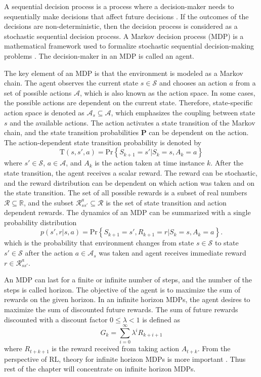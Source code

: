 \documentclass[english, 12pt, a4paper, elec, utf8, a-1b, online]{aaltothesis}
\renewcommand{\vec}[1]{\mathbf{#1}}
\newcommand{\Ss}{\mathcal{S}}
\newcommand{\As}{\mathcal{A}}
\newcommand{\Rs}{\mathcal{R}}
\renewcommand{\Pr}[1]{\text{Pr}\left\{ #1 \right\}}
\newcommand{\stprobs}{\vec{P}}
\newcommand{\real}{\mathbb{R}}
\begin{document}
A sequential decision process is a process where a decision-maker needs to sequentially make decisions that affect future decisions \cite{LaValle2006}.
If the outcomes of the decisions are non-deterministic, then the decision process is considered as a stochastic sequential decision process.
A Markov decision process (MDP) is a mathematical framework used to formalize stochastic sequential decision-making problems \cite{Sutton2018}.
The decision-maker in an MDP is called an agent.

The key element of an MDP is that the environment is modeled as a Markov chain.
The agent observes the current state $s \in \Ss$ and chooses an action $a$ from a set of possible actions $\As$, which is also known as the action space.
In some cases, the possible actions are dependent on the current state.
Therefore, state-specific action space is denoted as $\As_s \subseteq \As$, which emphasizes the coupling between state $s$ and the available actions. 
The action activates a state transition of the Markov chain, and the state transition probabilities $\stprobs$ can be dependent on the action.
The action-dependent state transition probability is denoted by 
\begin{equation}\label{eq:mdp_st_prob}
    \mathrm{T}(s, s', a) = \Pr{S_{k+1}=s' | S_{k}=s , A_k=a}
\end{equation}
where $s' \in \Ss$, $a \in \As$, and $A_k$ is the action taken at time instance $k$.  
After the state transition, the agent receives a scalar reward.
The reward can be stochastic, and the reward distribution can be dependent on which action was taken and on the state transition.
The set of all possible rewards is a subset of real numbers $\Rs \subseteq \real$, and the subset $\Rs_{ss'}^a \subseteq \Rs$ is the set of state transition and action dependent rewards.
The dynamics of an MDP can be summarized with a single probability distribution
\begin{equation}\label{eq:MDP_probs}
    p(s', r | s, a) = \Pr{ S_{k+1}=s', R_{k+1}=r | S_k=s, A_k=a }.
\end{equation}
which is the probability that environment changes from state $s \in \Ss$ to state $s' \in \Ss$ after the action $a \in \As_s$ was taken and agent receives immediate reward $r \in \Rs_{ss'}^a$.

An MDP can last for a finite or infinite number of steps, and the number of the steps is called horizon.
The objective of the agent is to maximize the sum of rewards on the given horizon.
In an infinite horizon MDPs, the agent desires to maximize the sum of discounted future rewards.
The sum of future rewards discounted with a discount factor $0 \leq \lambda < 1$ is defined as
\begin{equation}\label{eq:discounted_sum}
    G_k = \sum_{i=0}^{\infty} \lambda^i R_{k + i + 1}
\end{equation}
where $R_{t+k+1}$ is the reward received from taking action $A_{t+k}$. 
From the perspective of RL, theory for infinite horizon MDPs is more important \cite{Sutton2018}. Thus rest of the chapter will concentrate on infinite horizon MDPs.
\end{document}
